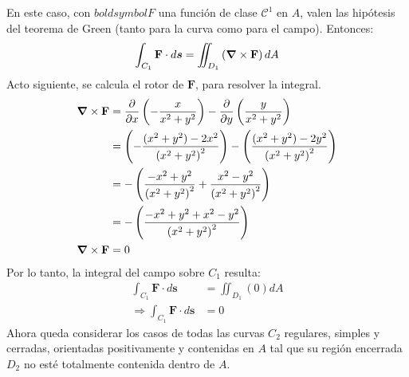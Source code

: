 \begin{solution}
\begin{center}
\begin{tikzpicture}
        \end{tikzpicture}
    \end{center}
    En este caso, con $boldsymbol{F}$ una función de clase
    $\mathcal{C}^1$ en $A$, valen las hipótesis del teorema de Green (tanto para la curva como para el campo). Entonces:
    \begin{equation*}
        \int_{C_1}\mathbf{F}\cdot d\boldsymbol{s} = \iint_{D_1}\left(\grad \times \mathbf{F}\right)dA
    \end{equation*}
    Acto siguiente, se calcula el rotor de $\mathbf{F}$, para resolver la integral.
    \begin{align*}
        \grad \times \mathbf{F} &= \frac{\partial}{\partial x}\left( -\frac{x}{x^2+y^2}\right) - \frac{\partial}{\partial y}\left(\frac{y}{x^2+y^2}\right)\\
        &= \left(-\frac{(x^2+y^2)-2x^2}{\left(x^2+y^2\right)^2}\right) - \left(\frac{(x^2+y^2)-2y^2}{\left(x^2+y^2\right)^2}\right)\\
        &= -\left(\frac{-x^2+y^2}{\left(x^2+y^2\right)^2}+\frac{x^2-y^2}{\left(x^2+y^2\right)^2}\right)\\
        &= -\left(\frac{-x^2+y^2+x^2-y^2}{\left(x^2+y^2\right)^2}\right)\\
        \grad \times \mathbf{F}&= 0
    \end{align*}
    Por lo tanto, la integral del campo sobre $C_1$ resulta:
    \begin{align*}
        \int_{C_1}\mathbf{F}\cdot d\boldsymbol{s} &= \iint_{D_1}\left(0\right)dA\\
        \Rightarrow \int_{C_1}\mathbf{F}\cdot d\boldsymbol{s} &= 0
    \end{align*}
    Ahora queda considerar los casos de todas las curvas $C_2$ regulares, simples y cerradas, orientadas positivamente
    y contenidas en $A$ tal que su región encerrada $D_2$ no esté totalmente contenida dentro de $A$.
    \begin{center}
\end{center}
\end{solution}
